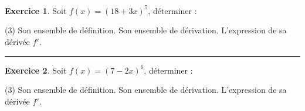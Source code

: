 \documentclass{exam}
\title{\Document\ \Titre \Type}
\theoremstyle{definition}
\newtheorem{exercice}{Exercice}
\begin{document}
\large


\begin{exercice}
    Soit $f(x) = (18 + 3x)^5$, déterminer :
    \begin{tasks}[style=enumerate](3)
        \task Son ensemble de définition.
        \task Son ensemble de dérivation.
        \task L'expression de sa dérivée $f'$.
    \end{tasks}
    \begin{center}
        \framebox[1\textwidth]{\parbox{5.5in}{
        \vspace{24em}}}
    \end{center}
\end{exercice}

\hrule

\vspace{1em}
\setcounter{exercice}{0}


\begin{exercice}
    Soit $f(x) = (7 - 2x)^6$, déterminer :
    \begin{tasks}[style=enumerate](3)
        \task Son ensemble de définition.
        \task Son ensemble de dérivation.
        \task L'expression de sa dérivée $f'$.
    \end{tasks}
    \begin{center}
        \framebox[1\textwidth]{\parbox{5.5in}{
        \vspace{24em}}}
    \end{center}
\end{exercice}
\end{document}
